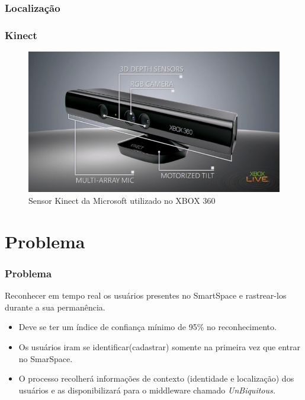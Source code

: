 \documentclass{beamer}
\begin{document}
\begin{frame}
    \frametitle{Localização}
   
\end{frame}


\begin{frame}
    \frametitle{Kinect}
    
    \begin{figure}[h]
    \centering \includegraphics[scale=0.4]{figuras/kinect_info.jpg}
        \caption{Sensor Kinect da Microsoft utilizado no XBOX 360}
        \label{reconhecimento_facial}
    \end{figure}
\end{frame}

\section{Problema}
\begin{frame}
    \frametitle{Problema}
    Reconhecer em tempo real os usuários presentes no SmartSpace e rastrear-los durante a sua permanência. \\
	\begin{itemize}
      		\pause \item Deve se ter um índice de confiança mínimo de 95\% no reconhecimento. \\
		\pause \item Os usuários iram se identificar(cadastrar) somente na primeira vez que entrar no SmarSpace. \\
    		\pause \item O processo recolherá informações de contexto (identidade e localização) dos usuários e as disponibilizará para o middleware chamado \it{UnBiquitous}.
	\end{itemize}
\end{frame}
\end{document}
